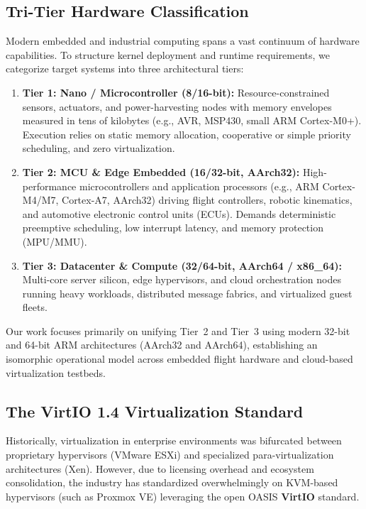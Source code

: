 \documentclass[10pt,journal,compsoc,twocolumn]{article}
\begin{document}
\subsection{Tri-Tier Hardware Classification}
Modern embedded and industrial computing spans a vast continuum of hardware capabilities. To structure kernel deployment and runtime requirements, we categorize target systems into three architectural tiers:

\begin{enumerate}[leftmargin=*]
    \item \textbf{Tier 1: Nano / Microcontroller (8/16-bit):} Resource-constrained sensors, actuators, and power-harvesting nodes with memory envelopes measured in tens of kilobytes (e.g., AVR, MSP430, small ARM Cortex-M0+). Execution relies on static memory allocation, cooperative or simple priority scheduling, and zero virtualization.
    \item \textbf{Tier 2: MCU \& Edge Embedded (16/32-bit, AArch32):} High-performance microcontrollers and application processors (e.g., ARM Cortex-M4/M7, Cortex-A7, AArch32) driving flight controllers, robotic kinematics, and automotive electronic control units (ECUs). Demands deterministic preemptive scheduling, low interrupt latency, and memory protection (MPU/MMU).
    \item \textbf{Tier 3: Datacenter \& Compute (32/64-bit, AArch64 / x86\_64):} Multi-core server silicon, edge hypervisors, and cloud orchestration nodes running heavy workloads, distributed message fabrics, and virtualized guest fleets.
\end{enumerate}

Our work focuses primarily on unifying Tier~2 and Tier~3 using modern 32-bit and 64-bit ARM architectures (AArch32 and AArch64), establishing an isomorphic operational model across embedded flight hardware and cloud-based virtualization testbeds.

\subsection{The VirtIO 1.4 Virtualization Standard}
Historically, virtualization in enterprise environments was bifurcated between proprietary hypervisors (VMware ESXi) and specialized para-virtualization architectures (Xen). However, due to licensing overhead and ecosystem consolidation, the industry has standardized overwhelmingly on KVM-based hypervisors (such as Proxmox VE) leveraging the open OASIS \textbf{VirtIO} standard.
\end{document}
